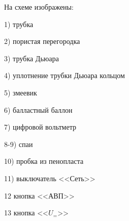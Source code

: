 \documentclass[a4paper,12pt]{article} %
\begin{document}
На схеме изображены:\\[0.1 cm]


\begin{minipage}{0.4\textwidth}
  
  1) трубка
  
  2) пористая перегородка
  
  3) трубка Дьюара
  
  4) уплотнение трубки Дьюара кольцом
  
  5) змеевик
  
  6) балластный баллон
\end{minipage}
\hfill
\begin{minipage}{0.4\textwidth}
  
  
  7) цифровой вольтметр
  
  8-9) спаи
  
  10) пробка из пенопласта
  
  11) выключатель <<Сеть>>
  
  12 кнопка <<АВП>>
  
  13 кнопка <<$U_=$>>
  
  
\end{minipage}\\[0.3 cm]
\end{document}

